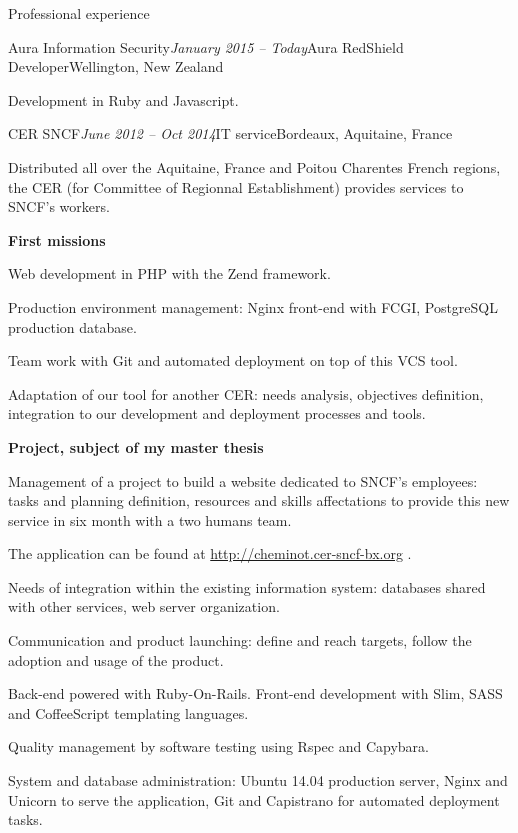 \begin{rSection}{Professional experience}

  \begin{rSubsection}{Aura Information Security}{\em January 2015 -- Today}{Aura RedShield Developer}{Wellington, New Zealand}
    \item[] Development in Ruby and Javascript.
  \end{rSubsection}



  \begin{rSubsection}{CER SNCF}{\em June 2012 -- Oct 2014}{IT service}{Bordeaux, Aquitaine, France}
    \item[] Distributed all over the Aquitaine, France and Poitou Charentes French regions, the CER (for Committee of Regionnal Establishment) provides services to SNCF's workers.

    \textbf{First missions}
      \item Web development in PHP with the Zend framework.
      \item Production environment management: Nginx front-end with FCGI, PostgreSQL production database.
      \item Team work with Git and automated deployment on top of this VCS tool.
      \item Adaptation of our tool for another CER: needs analysis, objectives definition, integration to our development and deployment processes and tools.

    \textbf{Project, subject of my master thesis}
      \item Management of a project to build a website dedicated to SNCF's employees: tasks and planning definition, resources and skills affectations to provide this new service in six month with a two humans team.
      \item The application can be found at \href{http://cheminot.cer-sncf-bx.org}{http://cheminot.cer-sncf-bx.org} .
      \item Needs of integration within the existing information system: databases shared with other services, web server organization.
      \item Communication and product launching: define and reach targets, follow the adoption and usage of the product.
      \item Back-end powered with Ruby-On-Rails. Front-end development with Slim, SASS and CoffeeScript templating languages.
      \item Quality management by software testing using Rspec and Capybara.
      \item System and database administration: Ubuntu 14.04 production server, Nginx and Unicorn to serve the application, Git and Capistrano for automated deployment tasks.


\end{rSubsection}
\end{rSection}
